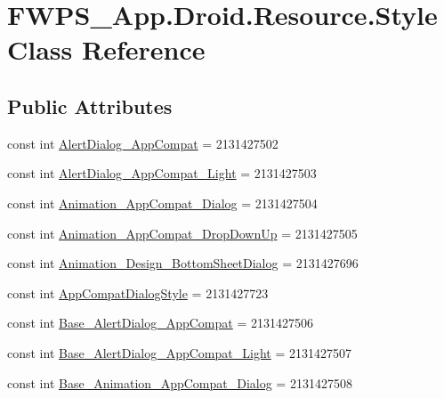 \hypertarget{class_f_w_p_s___app_1_1_droid_1_1_resource_1_1_style}{}\section{F\+W\+P\+S\+\_\+\+App.\+Droid.\+Resource.\+Style Class Reference}
\label{class_f_w_p_s___app_1_1_droid_1_1_resource_1_1_style}
\subsection*{Public Attributes}
\begin{DoxyCompactItemize}
\item 
const int \mbox{\hyperlink{class_f_w_p_s___app_1_1_droid_1_1_resource_1_1_style_aa80686166767a83ce766f0dc169e06d9}{Alert\+Dialog\+\_\+\+App\+Compat}} = 2131427502
\item 
const int \mbox{\hyperlink{class_f_w_p_s___app_1_1_droid_1_1_resource_1_1_style_a20af3a5066577177dab3a6dddc8206e8}{Alert\+Dialog\+\_\+\+App\+Compat\+\_\+\+Light}} = 2131427503
\item 
const int \mbox{\hyperlink{class_f_w_p_s___app_1_1_droid_1_1_resource_1_1_style_a48fc60cb3093f497559a7c6c99cf506e}{Animation\+\_\+\+App\+Compat\+\_\+\+Dialog}} = 2131427504
\item 
const int \mbox{\hyperlink{class_f_w_p_s___app_1_1_droid_1_1_resource_1_1_style_a86047e823818b2392cda1fc19c432123}{Animation\+\_\+\+App\+Compat\+\_\+\+Drop\+Down\+Up}} = 2131427505
\item 
const int \mbox{\hyperlink{class_f_w_p_s___app_1_1_droid_1_1_resource_1_1_style_a88e40af860a2c2b058f0a9790af5de9a}{Animation\+\_\+\+Design\+\_\+\+Bottom\+Sheet\+Dialog}} = 2131427696
\item 
const int \mbox{\hyperlink{class_f_w_p_s___app_1_1_droid_1_1_resource_1_1_style_a2254f174e82e6f95b2edafb5768b6141}{App\+Compat\+Dialog\+Style}} = 2131427723
\item 
const int \mbox{\hyperlink{class_f_w_p_s___app_1_1_droid_1_1_resource_1_1_style_a697dac7f13a3a943227fd7a9492b67a3}{Base\+\_\+\+Alert\+Dialog\+\_\+\+App\+Compat}} = 2131427506
\item 
const int \mbox{\hyperlink{class_f_w_p_s___app_1_1_droid_1_1_resource_1_1_style_a41d45dd2c05ae28e9ccb878d48e55405}{Base\+\_\+\+Alert\+Dialog\+\_\+\+App\+Compat\+\_\+\+Light}} = 2131427507
\item 
const int \mbox{\hyperlink{class_f_w_p_s___app_1_1_droid_1_1_resource_1_1_style_a18fb26aa11922c54a41ea353f433bb69}{Base\+\_\+\+Animation\+\_\+\+App\+Compat\+\_\+\+Dialog}} = 2131427508

\end{DoxyCompactItemize}

